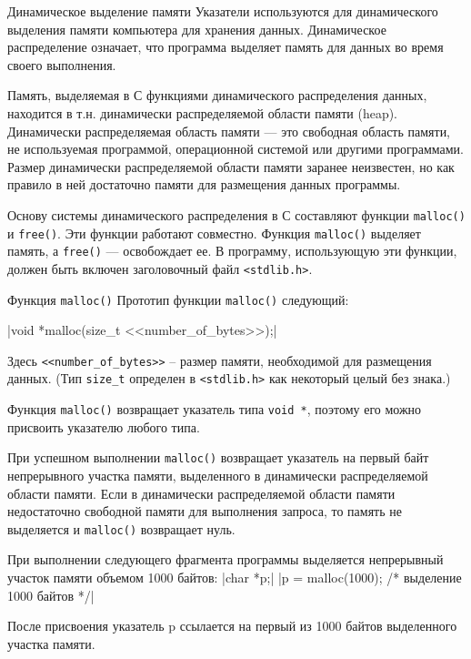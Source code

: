 \documentclass{beamer}
\begin{document}
\begin{frame}{Динамическое выделение памяти}
    Указатели используются для динамического выделения памяти
    компьютера для хранения данных. Динамическое распределение означает, что программа выделяет память для данных во время своего выполнения. 
    
    \medskip
    Память, выделяемая в С функциями динамического распределения данных, находится в т.н. динамически распределяемой области памяти (heap). Динамически распределяемая область памяти — это свободная область памяти, не используемая программой, операционной системой или другими программами. Размер динамически распределяемой области памяти заранее неизвестен, но как правило в ней достаточно памяти для размещения данных программы.
    
    \medskip
    Основу системы динамического распределения в С составляют функции
    \texttt{malloc()} и \texttt{free()}. Эти функции работают совместно. Функция \texttt{malloc()} выделяет память, а \texttt{free()} — освобождает ее.
    В программу, использующую эти функции, должен быть включен
    заголовочный файл \texttt{<stdlib.h>}.
\end{frame}

\begin{frame}{Функция \texttt{malloc()}}
    Прототип функции \texttt{malloc()} следующий:
    
    \medskip
    |void *malloc(size_t <<number_of_bytes>>);|
    
    \medskip Здесь \texttt{<<number\_of\_bytes>>} – размер памяти, необходимой для размещения данных. (Тип \texttt{size\_t} определен в \texttt{<stdlib.h>} как некоторый целый без знака.) 
    
    \medskip Функция \texttt{malloc()} возвращает указатель типа \texttt{void *}, поэтому его можно присвоить указателю любого типа.
    
    \medskip
    При успешном выполнении \texttt{malloc()} возвращает указатель на первый байт непрерывного участка памяти, выделенного в динамически распределяемой области памяти. Если в динамически распределяемой области памяти недостаточно свободной памяти для выполнения запроса, то память не выделяется и \texttt{malloc()} возвращает нуль.
    
    При выполнении следующего фрагмента программы выделяется непрерывный участок памяти объемом 1000 байтов:
    |char *p;|
    |p = malloc(1000); /* выделение 1000 байтов */|
    
    После присвоения указатель p ссылается на первый из 1000 байтов
    выделенного участка памяти.
\end{frame}
\end{document}
